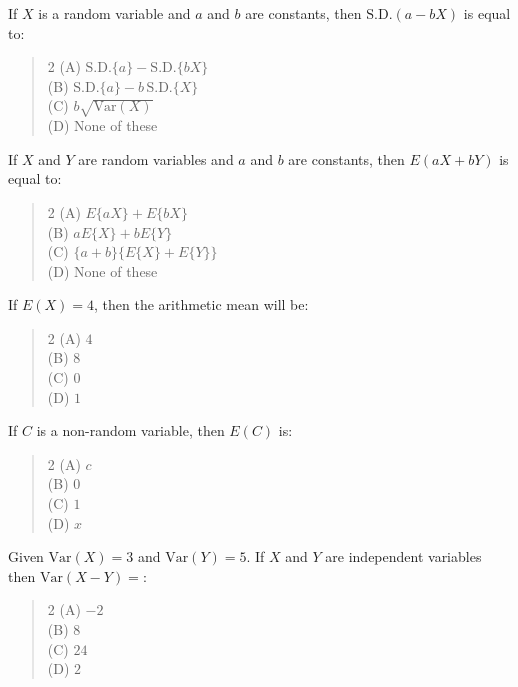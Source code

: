 \documentclass[11pt,a4paper]{article}
\begin{document}
\begin{mcqlist}
\item If $X$ is a random variable and $a$ and $b$ are constants, then $\mathrm{S.D.}(a-bX)$ is equal to:
\begin{quote}\begin{multicols}{2}
\noindent (A) $\mathrm{S.D.}\{a\}-\mathrm{S.D.}\{bX\}$ \\
(B) $\mathrm{S.D.}\{a\}-b\,\mathrm{S.D.}\{X\}$ \\
(C) $b\sqrt{\mathrm{Var}(X)}$ \\
(D) None of these
\end{multicols}\end{quote}

\item If $X$ and $Y$ are random variables and $a$ and $b$ are constants, then $E(aX+bY)$ is equal to:
\begin{quote}\begin{multicols}{2}
\noindent (A) $E\{aX\}+E\{bX\}$ \\
(B) $aE\{X\}+bE\{Y\}$ \\
(C) $\{a+b\}\{E\{X\}+E\{Y\}\}$ \\
(D) None of these
\end{multicols}\end{quote}

\item If $E(X)=4$, then the arithmetic mean will be:
\begin{quote}\begin{multicols}{2}
\noindent (A) $4$ \\
(B) $8$ \\
(C) $0$ \\
(D) $1$
\end{multicols}\end{quote}

\item If $C$ is a non-random variable, then $E(C)$ is:
\begin{quote}\begin{multicols}{2}
\noindent (A) $c$ \\
(B) $0$ \\
(C) $1$ \\
(D) $x$
\end{multicols}\end{quote}

\item Given $\mathrm{Var}(X)=3$ and $\mathrm{Var}(Y)=5$. If $X$ and $Y$ are independent variables then $\mathrm{Var}(X-Y)=$:
\begin{quote}\begin{multicols}{2}
\noindent (A) $-2$ \\
(B) $8$ \\
(C) $24$ \\
(D) $2$
\end{multicols}\end{quote}


\end{mcqlist}
\end{document}
